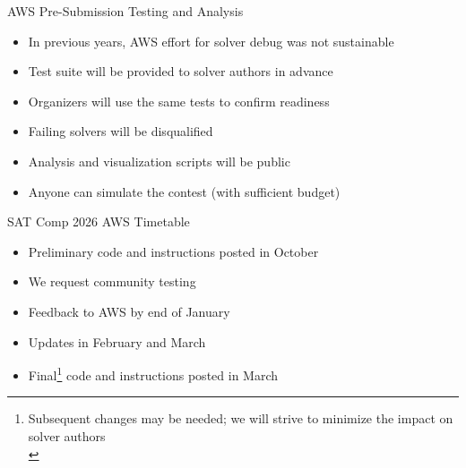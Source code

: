 \documentclass{beamer}
\begin{document}
\begin{frame}{AWS Pre-Submission Testing and Analysis}

\large

\begin{itemize}
\item In previous years, AWS effort for solver debug was not sustainable\\[10pt]
\item Test suite will be provided to solver authors in advance\\[10pt]
\item Organizers will use the same tests to confirm readiness\\[10pt]
\item Failing solvers will be disqualified\\[10pt]
\item Analysis and visualization scripts will be public\\[10pt]
\item Anyone can simulate the contest (with sufficient budget)
\end{itemize}

\end{frame}


\begin{frame}{SAT Comp 2026 AWS Timetable}

\large

\begin{itemize}
\item Preliminary code and instructions posted in October\\[10pt]
\item We request community testing\\[10pt]
\item Feedback to AWS by end of January\\[10pt]
\item Updates in February and March\\[10pt]
\item Final\footnote{\normalsize Subsequent changes may be needed; we will strive to minimize the impact on solver authors\\[20pt]} code and instructions posted in March
\end{itemize}

\end{frame}
\end{document}
